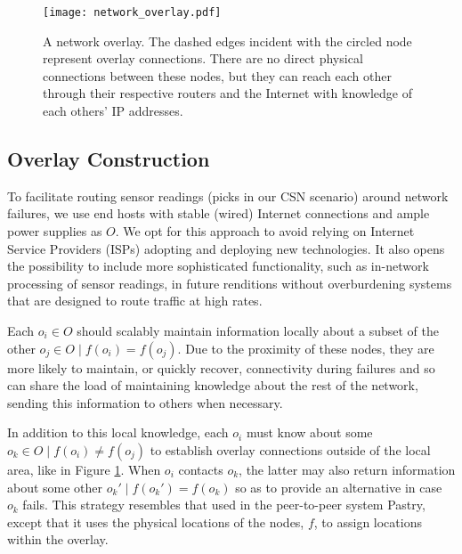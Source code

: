\documentclass[conference]{IEEEtran}
\begin{document}
\begin{figure}
\centering
\texttt{[image: network\_overlay.pdf]}
\caption{A network overlay. The dashed edges incident with the circled node represent overlay connections.  There are no direct physical connections between these nodes, but they can reach each other through their respective routers and the Internet with knowledge of each others' IP addresses.}
\label{fig_net_overlay}
\end{figure}


\subsection{Overlay Construction}
\label{overlay_construction}

To facilitate routing sensor readings (picks in our CSN scenario) around network failures, we use end hosts with stable (wired) Internet connections and ample power supplies as $O$.
We opt for this approach to avoid relying on Internet Service Providers (ISPs) adopting and deploying new technologies.
It also opens the possibility to include more sophisticated functionality, such as in-network processing of sensor readings, in future renditions without overburdening systems that are designed to route traffic at high rates.

Each $o_i \in O$ should scalably maintain information locally about a subset of the other $o_j \in O \mid f(o_i) = f(o_j)$.
Due to the proximity of these nodes, they are more likely to maintain, or quickly recover, connectivity during failures and so can share the load of maintaining knowledge about the rest of the network, sending this information to others when necessary.

In addition to this local knowledge, each $o_i$ must know about some $o_k \in O \mid f(o_i) \neq f(o_j)$ to establish overlay connections outside of the local area, like in Figure \ref{fig_net_overlay}.
When $o_i$ contacts $o_k$, the latter may also return information about some other $o_k' \mid f(o_k')=f(o_k)$ so as to provide an alternative in case $o_k$ fails.
This strategy resembles that used in the peer-to-peer system Pastry\cite{pastry}, except that it uses the physical locations of the nodes, $f$, to assign locations within the overlay.
\end{document}
